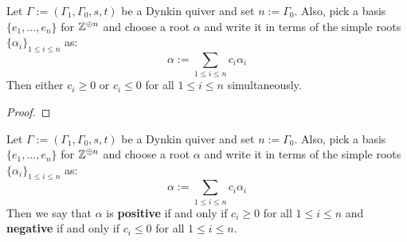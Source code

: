             \begin{lemma} \label{lemma: roots_are_exclusively_either_negative_or_positive}
                Let $\Gamma := (\Gamma_1, \Gamma_0, s, t)$ be a Dynkin quiver and set $n := \Gamma_0$. Also, pick a basis $\{e_1, ..., e_n\}$ for $\mathbb{Z}^{\oplus n}$ and choose a root $\alpha$ and write it in terms of the simple roots $\{\alpha_i\}_{1 \leq i \leq n}$ as:
                    $$\alpha := \sum_{1 \leq i \leq n} c_i \alpha_i$$
                Then either $c_i \geq 0$ or $c_i \leq 0$ for all $1 \leq i \leq n$ simultaneously.
            \end{lemma}
                \begin{proof}
                    
                \end{proof}
            \begin{definition} \label{def: negative_and_positive_roots}
                Let $\Gamma := (\Gamma_1, \Gamma_0, s, t)$ be a Dynkin quiver and set $n := \Gamma_0$. Also, pick a basis $\{e_1, ..., e_n\}$ for $\mathbb{Z}^{\oplus n}$ and choose a root $\alpha$ and write it in terms of the simple roots $\{\alpha_i\}_{1 \leq i \leq n}$ as:
                    $$\alpha := \sum_{1 \leq i \leq n} c_i \alpha_i$$
                Then we say that $\alpha$ is \textbf{positive} if and only if $c_i \geq 0$ for all $1 \leq i \leq n$ and \textbf{negative} if and only if $c_i \leq 0$ for all $1 \leq i \leq n$.
            \end{definition}
            \begin{example}
                
            \end{example}
            
